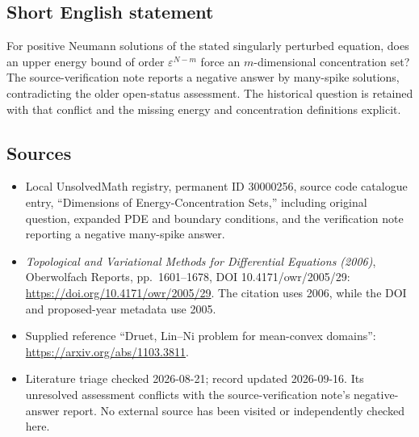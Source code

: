 \documentclass[11pt]{article}
\begin{document}
\subsection{Short English statement}
For positive Neumann solutions of the stated singularly perturbed equation, does an upper energy bound of order \(\varepsilon^{N-m}\) force an \(m\)-dimensional concentration set? The source-verification note reports a negative answer by many-spike solutions, contradicting the older open-status assessment. The historical question is retained with that conflict and the missing energy and concentration definitions explicit.
\subsection{Sources}
\begin{itemize}
\item Local UnsolvedMath registry, permanent ID 30000256, source code catalogue entry, ``Dimensions of Energy-Concentration Sets,'' including original question, expanded PDE and boundary conditions, and the verification note reporting a negative many-spike answer.
\item \emph{Topological and Variational Methods for Differential Equations (2006)}, Oberwolfach Reports, pp.\ 1601--1678, DOI 10.4171/owr/2005/29: \url{https://doi.org/10.4171/owr/2005/29}. The citation uses 2006, while the DOI and proposed-year metadata use 2005.
\item Supplied reference ``Druet, Lin--Ni problem for mean-convex domains'': \url{https://arxiv.org/abs/1103.3811}.
\item Literature triage checked 2026-08-21; record updated 2026-09-16. Its unresolved assessment conflicts with the source-verification note's negative-answer report. No external source has been visited or independently checked here.
\end{itemize}
\end{document}
